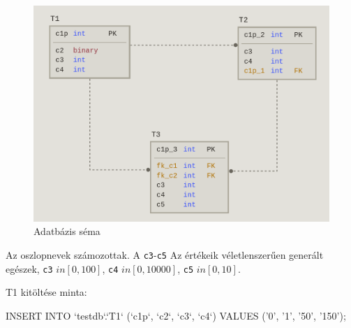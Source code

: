 \begin{figure}[h!]
\centering
\includegraphics[width=\textwidth]{images/schema.png}
\caption{Adatbázis séma}
\label{fig:schema}
\end{figure}

Az oszlopnevek számozottak. A \texttt{c3}-\texttt{c5} Az értékeik véletlenszerűen generált egészek, \texttt{c3} $in [0, 100]$, \texttt{c4} $in [0, 10000]$, \texttt{c5} $in [0, 10]$.

T1 kitöltése minta:
\begin{python}
INSERT INTO `testdb`.`T1` (`c1p`, `c2`, `c3`, `c4`)
VALUES ('0', '1', '50', '150');
\end{python}
